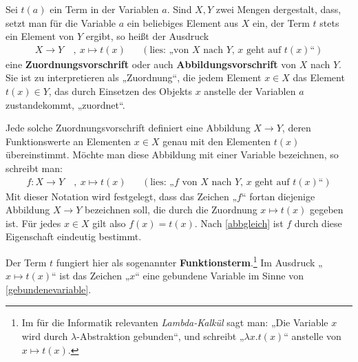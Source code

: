 \begin{nota} \label{def:zuordnung}   
    Sei $t(a)$ ein Term in der Variablen $a$. Sind $X,Y$ zwei Mengen dergestalt, dass, setzt man für die Variable $a$ ein beliebiges Element aus $X$ ein, der Term $t$ stets ein Element von $Y$ ergibt, so heißt der Ausdruck
    \begin{align*}
        X \to Y \ &,\ x\mapsto t(x) && (\text{lies: „von $X$ nach $Y$, $x$ geht auf $t(x)$“})
    \end{align*}
    eine \textbf{Zuordnungsvorschrift} oder auch \textbf{Abbildungsvorschrift} von $X$ nach $Y$. Sie ist zu interpretieren als „Zuordnung“, die jedem Element $x\in X$ das Element $t(x)\in Y$, das durch Einsetzen des Objekts $x$ anstelle der Variablen $a$ zustandekommt, „zuordnet“.
    
    Jede solche Zuordnungsvorschrift definiert eine Abbildung $X\to Y$, deren Funktionswerte an Elementen $x\in X$ genau mit den Elementen $t(x)$ übereinstimmt. Möchte man diese Abbildung mit einer Variable bezeichnen, so schreibt man:
    \begin{align*}
        f : X\to Y \ & ,\ x\mapsto t(x) && (\text{lies: „$f$ von $X$ nach $Y$, $x$ geht auf $t(x)$“})
    \end{align*}
    Mit dieser Notation wird festgelegt, dass das Zeichen „$f$“ fortan diejenige Abbildung $X\to Y$ bezeichnen soll, die durch die Zuordnung $x\mapsto t(x)$ gegeben ist. Für jedes $x\in X$ gilt also $f(x)=t(x)$. Nach \cref{abbgleich} ist $f$ durch diese Eigenschaft eindeutig bestimmt.

    Der Term $t$ fungiert hier als sogenannter \textbf{Funktionsterm}.\footnote{Im für die Informatik relevanten \emph{Lambda-Kalkül} sagt man: „Die Variable $x$ wird durch $\lambda$-Abstraktion gebunden“, und schreibt „$\lambda x.t(x)$“ anstelle von $x\mapsto t(x)$.} Im Ausdruck „$x\mapsto t(x)$“ ist das Zeichen „$x$“ eine gebundene Variable im Sinne von \cref{gebundenevariable}.
\end{nota}


